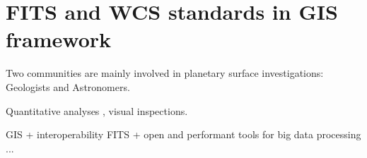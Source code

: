 \documentclass[11pt]{article}
\begin{document}
\section*{FITS and WCS standards in GIS framework}
Two communities are mainly involved in planetary surface investigations: Geologists and Astronomers.

Quantitative analyses , visual inspections.

GIS + interoperability
FITS + open and performant tools for big data processing
...
\end{document}
